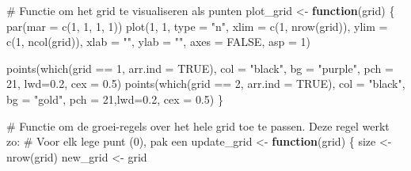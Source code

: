 \documentclass[
  a4paper,
]{scrbook}
\newenvironment{Shaded}{\begin{snugshade}}{\end{snugshade}}
\newcommand{\AttributeTok}[1]{\textcolor[rgb]{0.40,0.45,0.13}{#1}}
\newcommand{\CommentTok}[1]{\textcolor[rgb]{0.37,0.37,0.37}{#1}}
\newcommand{\ConstantTok}[1]{\textcolor[rgb]{0.56,0.35,0.01}{#1}}
\newcommand{\ControlFlowTok}[1]{\textcolor[rgb]{0.00,0.23,0.31}{\textbf{#1}}}
\newcommand{\DecValTok}[1]{\textcolor[rgb]{0.68,0.00,0.00}{#1}}
\newcommand{\FloatTok}[1]{\textcolor[rgb]{0.68,0.00,0.00}{#1}}
\newcommand{\FunctionTok}[1]{\textcolor[rgb]{0.28,0.35,0.67}{#1}}
\newcommand{\NormalTok}[1]{\textcolor[rgb]{0.00,0.23,0.31}{#1}}
\newcommand{\OtherTok}[1]{\textcolor[rgb]{0.00,0.23,0.31}{#1}}
\newcommand{\SpecialCharTok}[1]{\textcolor[rgb]{0.37,0.37,0.37}{#1}}
\newcommand{\StringTok}[1]{\textcolor[rgb]{0.13,0.47,0.30}{#1}}
\theoremstyle{definition}
\theoremstyle{remark}
\begin{document}
\begin{Shaded}
\begin{Highlighting}[]
\CommentTok{\# Functie om het grid te visualiseren als punten}
\NormalTok{plot\_grid }\OtherTok{\textless{}{-}} \ControlFlowTok{function}\NormalTok{(grid) \{}
  \FunctionTok{par}\NormalTok{(}\AttributeTok{mar =} \FunctionTok{c}\NormalTok{(}\DecValTok{1}\NormalTok{, }\DecValTok{1}\NormalTok{, }\DecValTok{1}\NormalTok{, }\DecValTok{1}\NormalTok{))}
  \FunctionTok{plot}\NormalTok{(}\DecValTok{1}\NormalTok{, }\DecValTok{1}\NormalTok{, }\AttributeTok{type =} \StringTok{"n"}\NormalTok{, }\AttributeTok{xlim =} \FunctionTok{c}\NormalTok{(}\DecValTok{1}\NormalTok{, }\FunctionTok{nrow}\NormalTok{(grid)), }\AttributeTok{ylim =} \FunctionTok{c}\NormalTok{(}\DecValTok{1}\NormalTok{, }\FunctionTok{ncol}\NormalTok{(grid)), }\AttributeTok{xlab =} \StringTok{""}\NormalTok{, }\AttributeTok{ylab =} \StringTok{""}\NormalTok{, }\AttributeTok{axes =} \ConstantTok{FALSE}\NormalTok{, }\AttributeTok{asp =} \DecValTok{1}\NormalTok{)}
  
  \FunctionTok{points}\NormalTok{(}\FunctionTok{which}\NormalTok{(grid }\SpecialCharTok{==} \DecValTok{1}\NormalTok{, }\AttributeTok{arr.ind =} \ConstantTok{TRUE}\NormalTok{), }\AttributeTok{col =} \StringTok{"black"}\NormalTok{, }\AttributeTok{bg =} \StringTok{"purple"}\NormalTok{, }\AttributeTok{pch =} \DecValTok{21}\NormalTok{, }\AttributeTok{lwd=}\FloatTok{0.2}\NormalTok{, }\AttributeTok{cex =} \FloatTok{0.5}\NormalTok{)}
  \FunctionTok{points}\NormalTok{(}\FunctionTok{which}\NormalTok{(grid }\SpecialCharTok{==} \DecValTok{2}\NormalTok{, }\AttributeTok{arr.ind =} \ConstantTok{TRUE}\NormalTok{), }\AttributeTok{col =} \StringTok{"black"}\NormalTok{, }\AttributeTok{bg =} \StringTok{"gold"}\NormalTok{, }\AttributeTok{pch =} \DecValTok{21}\NormalTok{,}\AttributeTok{lwd=}\FloatTok{0.2}\NormalTok{, }\AttributeTok{cex =} \FloatTok{0.5}\NormalTok{)}
\NormalTok{\}}

\CommentTok{\# Functie om de groei{-}regels over het hele grid toe te passen. Deze regel werkt zo:}
\CommentTok{\# Voor elk lege punt (0), pak een }
\NormalTok{update\_grid }\OtherTok{\textless{}{-}} \ControlFlowTok{function}\NormalTok{(grid) \{}
\NormalTok{  size }\OtherTok{\textless{}{-}} \FunctionTok{nrow}\NormalTok{(grid)}
\NormalTok{  new\_grid }\OtherTok{\textless{}{-}}\NormalTok{ grid}
  

\end{Highlighting}
\end{Shaded}
\end{document}
